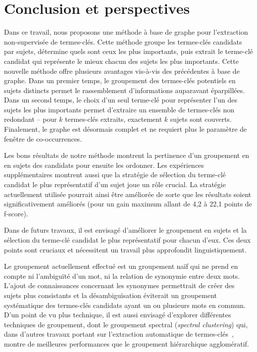 \section{Conclusion et perspectives}
\label{sec:conclusion_et_perspectives}
  Dans ce travail, nous proposons une méthode à base de graphe pour
  l'extraction non-supervisée de termes-clés. Cette méthode groupe les
  termes-clés candidats par sujets, détermine quels sont ceux les plus
  importants, puis extrait le terme-clé candidat qui représente le mieux chacun
  des sujets les plus importants. Cette nouvelle méthode offre plusieurs
  avantages vis-à-vis des précédentes à base de graphe. Dans un premier temps,
  le groupement des termes-clés potentiels en sujets distincts permet le
  rassemblement  d'informations auparavant éparpillées. Dans un second temps,
  le choix d'un seul terme-clé pour représenter l'un des sujets les plus
  importants permet d'extraire un ensemble de termes-clés non redondant -- pour
  $k$ termes-clés extraits, exactement $k$ sujets sont couverts. Finalement, le
  graphe est désormais complet et ne requiert plus le paramètre de fenêtre de
  co-occurrences.

  Les bons résultats de notre méthode montrent la pertinence d'un groupement en
  en sujets des candidats pour ensuite les ordonner. Les expériences
  supplémentaires montrent aussi que la stratégie de sélection du terme-clé
  candidat le plus représentatif d'un sujet joue un rôle crucial. La stratégie
  actuellement utilisée pourrait ainsi être améliorée de sorte que les résultats
  soient significativement améliorés (pour un gain maximum allant de 4,2 à 22,1
  points de f-score).

  Dans de futurs travaux, il est envisagé d'améliorer le groupement en sujets et
  la sélection du terme-clé candidat le plus représentatif pour chacun d'eux.
  Ces deux points sont cruciaux et nécessitent un travail plus approfondit
  linguistiquement.
  
  Le groupement actuellement effectué est un groupement naïf qui ne prend en
  compte ni l'ambiguïté d'un mot, ni la relation de synonymie entre deux mots.
  L'ajout de connaissances concernant les synonymes permettrait de créer des
  sujets plus consistants et la désambiguïsation éviterait un groupement
  systématique des termes-clés candidats ayant un ou plusieurs mots en commun.
  D'un point de vu plus technique, il est aussi envisagé d'explorer différentes
  techniques de groupement, dont le groupement spectral (\textit{spectral
  clustering}) qui, dans d'autres travaux portant sur l'extraction
  automatique de termes-clés~\cite{liu2009keycluster}, montre de meilleures
  performances que le groupement hiérarchique agglomératif.


